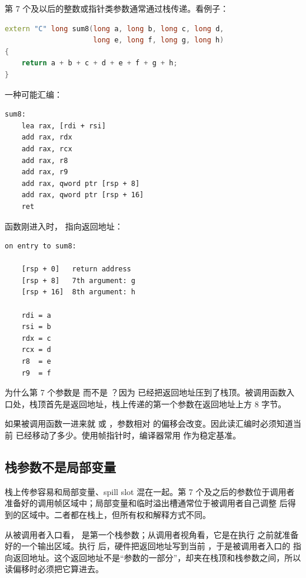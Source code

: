 第 7 个及以后的整数或指针类参数通常通过栈传递。看例子：

\begin{lstlisting}[language=C++]
extern "C" long sum8(long a, long b, long c, long d,
                     long e, long f, long g, long h)
{
    return a + b + c + d + e + f + g + h;
}
\end{lstlisting}

一种可能汇编：

\begin{lstlisting}
sum8:
    lea rax, [rdi + rsi]
    add rax, rdx
    add rax, rcx
    add rax, r8
    add rax, r9
    add rax, qword ptr [rsp + 8]
    add rax, qword ptr [rsp + 16]
    ret
\end{lstlisting}

函数刚进入时， 指向返回地址：

\begin{lstlisting}
on entry to sum8:

    [rsp + 0]   return address
    [rsp + 8]   7th argument: g
    [rsp + 16]  8th argument: h

    rdi = a
    rsi = b
    rdx = c
    rcx = d
    r8  = e
    r9  = f
\end{lstlisting}

为什么第 7 个参数是 \code{[rsp + 8]} 而不是 \code{[rsp]}？因为  已经把返回地址压到了栈顶。被调用函数入口处，栈顶首先是返回地址，栈上传递的第一个参数在返回地址上方 8 字节。

\begin{deepdive}
如果被调用函数一进来就  或 ，参数相对  的偏移会改变。因此读汇编时必须知道当前  已经移动了多少。使用帧指针时，编译器常用  作为稳定基准。
\end{deepdive}

\subsection{栈参数不是局部变量}

栈上传参容易和局部变量、spill slot 混在一起。第 7 个及之后的参数位于调用者准备好的调用帧区域中；局部变量和临时溢出槽通常位于被调用者自己调整  后得到的区域中。二者都在栈上，但所有权和解释方式不同。

从被调用者入口看，\code{[rsp + 8]} 是第一个栈参数；从调用者视角看，它是在执行  之前就准备好的一个输出区域。执行  后，硬件把返回地址写到当前 ，于是被调用者入口的  指向返回地址。这个返回地址不是“参数的一部分”，却夹在栈顶和栈参数之间，所以读偏移时必须把它算进去。

